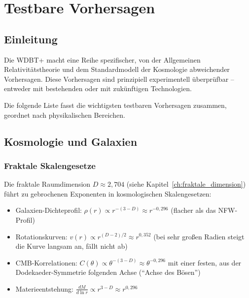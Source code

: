 
\chapter{Testbare Vorhersagen}
\label{ch:testbare_vorhersagen}

\section{Einleitung}
\label{sec:vorh_einleitung}

Die WDBT+ macht eine Reihe spezifischer, von der Allgemeinen Relativitätstheorie und dem Standardmodell der Kosmologie abweichender Vorhersagen. Diese Vorhersagen sind prinzipiell experimentell überprüfbar – entweder mit bestehenden oder mit zukünftigen Technologien.

Die folgende Liste fasst die wichtigsten testbaren Vorhersagen zusammen, geordnet nach physikalischen Bereichen.

\section{Kosmologie und Galaxien}
\label{sec:vorh_kosmologie}

\subsection{Fraktale Skalengesetze}
\label{sub:vorh_fraktale_skalen}

Die fraktale Raumdimension \( D \approx 2,704 \) (siehe Kapitel~\ref{ch:fraktale_dimension}) führt zu gebrochenen Exponenten in kosmologischen Skalengesetzen:

\begin{itemize}
    \item Galaxien-Dichteprofil: \( \rho(r) \propto r^{-(3-D)} \approx r^{-0,296} \) (flacher als das NFW-Profil)
    \item Rotationskurven: \( v(r) \propto r^{(D-2)/2} \approx r^{0,352} \) (bei sehr großen Radien steigt die Kurve langsam an, fällt nicht ab)
    \item CMB-Korrelationen: \( C(\theta) \propto \theta^{-(3-D)} \approx \theta^{-0,296} \) mit einer festen, aus der Dodekaeder-Symmetrie folgenden Achse (\enquote{Achse des Bösen})
    \item Materieentstehung: \( \frac{dM}{d\ln r} \propto r^{3-D} \approx r^{0,296} \)
\end{itemize}

